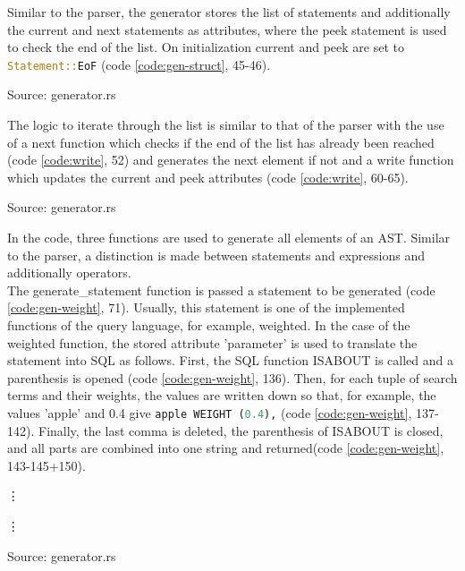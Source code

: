Similar to the parser, the generator stores the list of statements and additionally the current and next statements as attributes, where the peek statement is used to check the end of the list. On initialization current and peek are set to \lstinline[language=Rust]$Statement::EoF$ (code \ref{code:gen-struct}, 45-46).
\begin{codeenv}
    \label{code:gen-struct}
    
    \centerline{Source: generator.rs}
\end{codeenv}
The logic to iterate through the list is similar to that of the parser with the use of a next function which checks if the end of the list has already been reached (code \ref{code:write}, 52) and generates the next element if not and a write function which updates the current and peek attributes (code \ref{code:write}, 60-65).
\begin{codeenv}
    \label{code:write}
    
    \centerline{Source: generator.rs}
\end{codeenv}
In the code, three functions are used to generate all elements of an \ac{AST}. Similar to the parser, a distinction is made between statements and expressions and additionally operators.\\
The generate\_statement function is passed a statement to be generated (code \ref{code:gen-weight}, 71). Usually, this statement is one of the implemented functions of the query language, for example, weighted. In the case of the weighted function, the stored attribute 'parameter' is used to translate the statement into \ac{SQL} as follows. First, the \ac{SQL} function ISABOUT is called and a parenthesis is opened (code \ref{code:gen-weight}, 136). Then, for each tuple of search terms and their weights, the values are written down so that, for example, the values 'apple' and 0.4 give \lstinline[language=SQL]$apple WEIGHT (0.4),$ (code \ref{code:gen-weight}, 137-142). Finally, the last comma is deleted, the parenthesis of ISABOUT is closed, and all parts are combined into one string and returned(code \ref{code:gen-weight}, 143-145+150).
\begin{codeenv}
    \label{code:gen-weight}
    
    \vdots
    
    \vdots
    
    \centerline{Source: generator.rs}
\end{codeenv}
